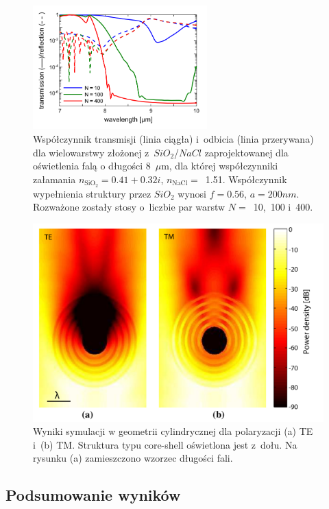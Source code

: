 \begin{figure}[tb]
	\centering
	\includegraphics[width=0.6\textwidth]{images/pml/oqe_trans_refl.png}
	\caption{Współczynnik transmisji (linia ciągła) i~odbicia (linia przerywana) dla wielowarstwy złożonej z~$SiO_2$/$NaCl$ zaprojektowanej dla oświetlenia falą o długości 8~$\mu$m, dla której współczynniki załamania $n_{\textrm{SiO}_2}=0.41+0.32i$, $n_{\textrm{NaCl}}=$~1.51. Współczynnik wypełnienia struktury przez $SiO_2$ wynosi $f=0.56$, $a=200nm$. Rozważone zostały stosy o~liczbie par warstw $N=$~10,~100 i~400.}
	\label{fig:oqe-trans-refl}
\end{figure}

\begin{figure}[tb]
	\includegraphics[width=\textwidth]{images/pml/oqe_coreshell.png}
	\caption{Wyniki symulacji w geometrii cylindrycznej dla polaryzacji (a) TE i~(b) TM. Struktura typu core-shell oświetlona jest z~dołu. Na rysunku (a) zamieszczono wzorzec długości fali.}
	\label{fig:oqecoreshell}
\end{figure}

\subsection{Podsumowanie wyników}

